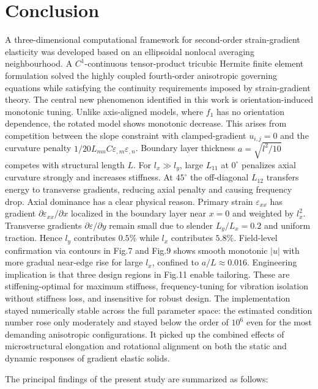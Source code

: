 \documentclass[final,3p,times,fleqn]{elsarticle}
\begin{document}
\section{\large{Conclusion}}

\label{sec:conclusion}

A three-dimensional computational framework for second-order
strain-gradient elasticity was developed based on an ellipsoidal
nonlocal averaging neighbourhood. A $C^{1}$-continuous tensor-product tricubic Hermite
finite element formulation solved the highly coupled fourth-order
anisotropic governing equations while satisfying the continuity
requirements imposed by strain-gradient theory.
The central new phenomenon identified in this work is orientation-induced monotonic tuning. Unlike axis-aligned models, where $f_1$ has no orientation dependence, the rotated model shows monotonic decrease. This arises from competition between the slope constraint with clamped-gradient $u_{i,j}=0$ and the curvature penalty $1/20 L_{mn}C\varepsilon_{,m}\varepsilon_{,n}$. Boundary layer thickness $a=\sqrt{l^2/10}$ competes with structural length $L$. For $l_x\gg l_y$, large $L_{11}$ at $0^\circ$ penalizes axial curvature strongly and increases stiffness. At $45^\circ$ the off-diagonal $L_{12}$ transfers energy to transverse gradients, reducing axial penalty and causing frequency drop. Axial dominance has a clear physical reason. Primary strain $\varepsilon_{xx}$ has gradient $\partial\varepsilon_{xx}/\partial x$ localized in the boundary layer near $x=0$ and weighted by $l_x^2$. Transverse gradients $\partial\varepsilon/\partial y$ remain small due to slender $L_y/L_x=0.2$ and uniform traction. Hence $l_y$ contributes $0.5\%$ while $l_x$ contributes $5.8\%$. Field-level confirmation via contours in Fig.7 and Fig.9 shows smooth monotonic $|u|$ with more gradual near-edge rise for large $l_x$, confined to $a/L\approx0.016$. Engineering implication is that three design regions in Fig.11 enable tailoring. These are stiffening-optimal for maximum stiffness, frequency-tuning for vibration isolation without stiffness loss, and insensitive for robust design. The implementation stayed numerically
stable across the full parameter space: the estimated condition number
rose only moderately and stayed below the order of $10^{6}$ even for the
most demanding anisotropic configurations. It picked up the combined
effects of microstructural elongation and rotational alignment on both
the static and dynamic responses of gradient elastic solids.

The principal findings of the present study are summarized as follows:
\end{document}
